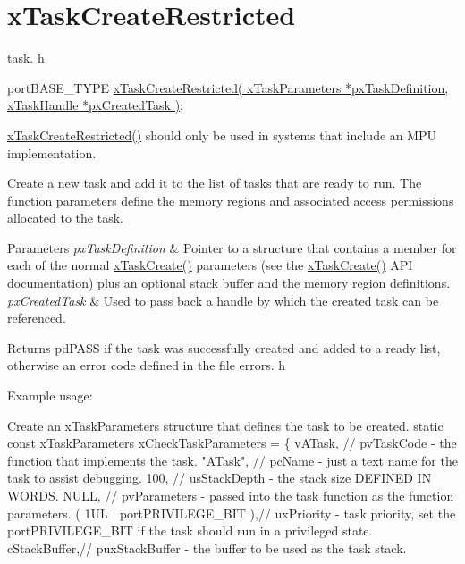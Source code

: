 \hypertarget{group__x_task_create_restricted}{\section{x\-Task\-Create\-Restricted}
\label{group__x_task_create_restricted}
}
task. h 
\begin{DoxyPre}
 portBASE\_TYPE \hyperlink{task_8h_a61b00cd623953f4f94fe794057d7f648}{xTaskCreateRestricted( xTaskParameters *pxTaskDefinition, xTaskHandle *pxCreatedTask )};\end{DoxyPre}


\hyperlink{task_8h_a61b00cd623953f4f94fe794057d7f648}{x\-Task\-Create\-Restricted()} should only be used in systems that include an M\-P\-U implementation.

Create a new task and add it to the list of tasks that are ready to run. The function parameters define the memory regions and associated access permissions allocated to the task.


\begin{DoxyParams}{Parameters}
{\em px\-Task\-Definition} & Pointer to a structure that contains a member for each of the normal \hyperlink{task_8h_adf67e7cd0bfd1eda9e8afd048206f7c2}{x\-Task\-Create()} parameters (see the \hyperlink{task_8h_adf67e7cd0bfd1eda9e8afd048206f7c2}{x\-Task\-Create()} A\-P\-I documentation) plus an optional stack buffer and the memory region definitions.\\
\hline
{\em px\-Created\-Task} & Used to pass back a handle by which the created task can be referenced.\\
\hline
\end{DoxyParams}
\begin{DoxyReturn}{Returns}
pd\-P\-A\-S\-S if the task was successfully created and added to a ready list, otherwise an error code defined in the file errors. h
\end{DoxyReturn}
Example usage\-: 
\begin{DoxyPre}
Create an xTaskParameters structure that defines the task to be created.
static const xTaskParameters xCheckTaskParameters =
\{
    vATask,     // pvTaskCode - the function that implements the task.
    "ATask",    // pcName - just a text name for the task to assist debugging.
    100,        // usStackDepth - the stack size DEFINED IN WORDS.
    NULL,       // pvParameters - passed into the task function as the function parameters.
    ( 1UL | portPRIVILEGE\_BIT ),// uxPriority - task priority, set the portPRIVILEGE\_BIT if the task should run in a privileged state.
    cStackBuffer,// puxStackBuffer - the buffer to be used as the task stack.\end{DoxyPre}




